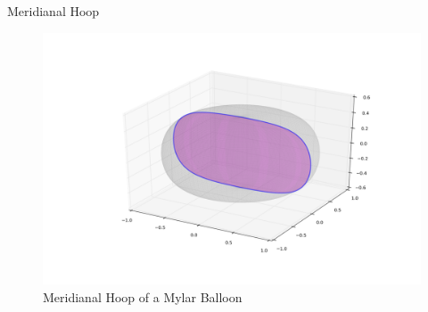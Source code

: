 \documentclass{beamer}
\begin{document}
\begin{frame}{Meridianal Hoop}

  \begin{figure}[!ht]
    \centering
    \includegraphics[width=1\textwidth]{mylar_balloon_meridianal_hoop.png}
    \caption{Meridianal Hoop of a Mylar Balloon }
  \end{figure}

\end{frame}
\end{document}
